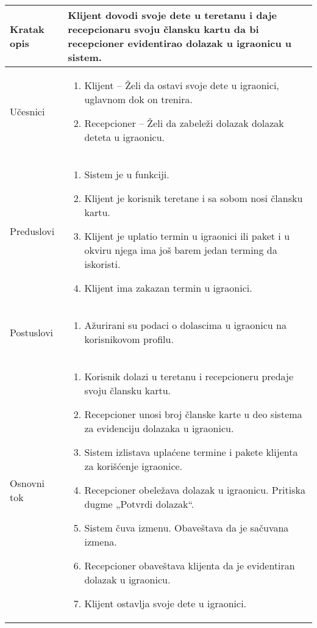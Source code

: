 \documentclass[../main.tex]{subfiles}
\begin{document}
\begin{longtable}{| p{} | p{} |} 
\hline
    Kratak opis &  Klijent dovodi svoje dete u teretanu i daje recepcionaru svoju člansku kartu da bi recepcioner evidentirao dolazak u igraonicu u sistem.\\ 
\hline    
    Učesnici & \begin{enumerate}
        \item Klijent – Želi da ostavi svoje dete u igraonici, uglavnom dok on trenira.
        \item Recepcioner – Želi da zabeleži dolazak dolazak deteta u igraonicu.   
     \end{enumerate}\\
\hline
   Preduslovi & \begin{enumerate}
       \item Sistem je u funkciji.
       \item Klijent je korisnik teretane i sa sobom nosi člansku kartu.
       \item Klijent je uplatio termin u igraonici ili paket i u okviru njega ima još barem jedan terming da iskoristi.
       \item Klijent ima zakazan termin u igraonici.
   \end{enumerate}\\
\hline  
    Postuslovi & \begin{enumerate}
        \item Ažurirani su podaci o dolascima u igraonicu na korisnikovom profilu.
    \end{enumerate}\\
\hline
    Osnovni tok & \begin{enumerate}
        \item Korisnik dolazi u teretanu i recepcioneru predaje svoju člansku kartu.
        \item Recepcioner unosi broj članske karte u deo sistema za evidenciju dolazaka u igraonicu.
        \item Sistem izlistava uplaćene termine i pakete klijenta za korišćenje igraonice.
        \item Recepcioner obeležava dolazak u igraonicu. Pritiska dugme „Potvrdi dolazak“.
        \item Sistem čuva izmenu. Obaveštava da je sačuvana izmena.
        \item Recepcioner obaveštava klijenta da je evidentiran dolazak u igraonicu.
        \item Klijent ostavlja svoje dete u igraonici.

\end{enumerate}
\end{longtable}
\end{document}
